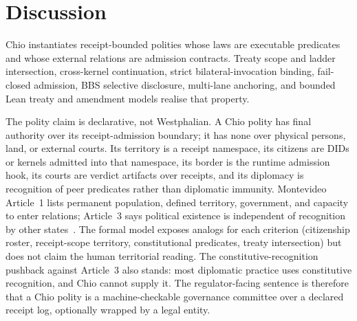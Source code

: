 \section{Discussion}
\label{sec:discussion}

Chio instantiates receipt-bounded polities whose laws are executable predicates and whose external relations are admission contracts. Treaty scope and ladder intersection, cross-kernel continuation, strict bilateral-invocation binding, fail-closed admission, BBS selective disclosure, multi-lane anchoring, and bounded Lean treaty and amendment models realise that property.

The polity claim is declarative, not Westphalian. A Chio polity has final authority over its receipt-admission boundary; it has none over physical persons, land, or external courts. Its territory is a receipt namespace, its citizens are DIDs or kernels admitted into that namespace, its border is the runtime admission hook, its courts are verdict artifacts over receipts, and its diplomacy is recognition of peer predicates rather than diplomatic immunity. Montevideo Article~1 lists permanent population, defined territory, government, and capacity to enter relations; Article~3 says political existence is independent of recognition by other states~\cite{montevideo,crawfordStatehood}. The formal model exposes analogs for each criterion (citizenship roster, receipt-scope territory, constitutional predicates, treaty intersection) but does not claim the human territorial reading. The constitutive-recognition pushback against Article~3 also stands: most diplomatic practice uses constitutive recognition, and Chio cannot supply it. The regulator-facing sentence is therefore that a Chio polity is a machine-checkable governance committee over a declared receipt log, optionally wrapped by a legal entity.

